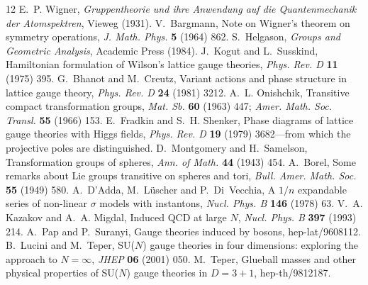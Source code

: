 \documentclass[11pt,a4paper]{article}
\theoremstyle{plain}
\theoremstyle{definition}
\theoremstyle{remark}
\begin{document}
\begin{thebibliography}{12}
 E.~P. Wigner, \emph{Gruppentheorie und ihre Anwendung auf die Quantenmechanik der Atomspektren}, Vieweg (1931).
 V.~Bargmann, Note on Wigner's theorem on symmetry operations, \emph{J. Math. Phys.} \textbf{5} (1964) 862.
 S.~Helgason, \emph{Groups and Geometric Analysis}, Academic Press (1984).
 J.~Kogut and L.~Susskind, Hamiltonian formulation of Wilson's lattice gauge theories, \emph{Phys. Rev. D} \textbf{11} (1975) 395.
 G.~Bhanot and M.~Creutz, Variant actions and phase structure in lattice gauge theory, \emph{Phys. Rev. D} \textbf{24} (1981) 3212.
 A.~L. Onishchik, Transitive compact transformation groups, \emph{Mat. Sb.} \textbf{60} (1963) 447; \emph{Amer. Math. Soc. Transl.} \textbf{55} (1966) 153.
 E.~Fradkin and S.~H. Shenker, Phase diagrams of lattice gauge theories with Higgs fields, \emph{Phys. Rev. D} \textbf{19} (1979) 3682---from which the projective poles are distinguished.
 D.~Montgomery and H.~Samelson, Transformation groups of spheres, \emph{Ann. of Math.} \textbf{44} (1943) 454.
 A.~Borel, Some remarks about Lie groups transitive on spheres and tori, \emph{Bull. Amer. Math. Soc.} \textbf{55} (1949) 580.
 A.~D'Adda, M.~L\"uscher and P.~Di~Vecchia, A $1/n$ expandable series of non-linear $\sigma$ models with instantons, \emph{Nucl. Phys. B} \textbf{146} (1978) 63.
 V.~A. Kazakov and A.~A. Migdal, Induced QCD at large $N$, \emph{Nucl. Phys. B} \textbf{397} (1993) 214.
 A.~Pap and P.~Suranyi, Gauge theories induced by bosons, hep-lat/9608112.
 B.~Lucini and M.~Teper, SU($N$) gauge theories in four dimensions: exploring the approach to $N=\infty$, \emph{JHEP} \textbf{06} (2001) 050.
 M.~Teper, Glueball masses and other physical properties of SU($N$) gauge theories in $D=3+1$, hep-th/9812187.
\end{thebibliography}
\end{document}
